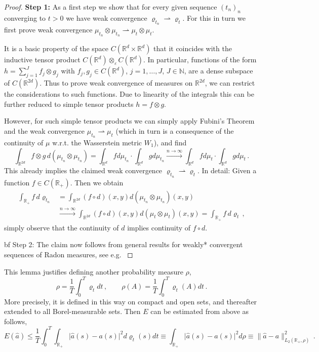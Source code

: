 \documentclass[A4paper,11pt]{article}
\theoremstyle{definition}
\newcommand{\N}{\mathbb{N}}
\newcommand{\R}{\mathbb{R}}
\begin{document}
\begin{proof}
	{\bf Step 1:} As a first step we show that for every given sequence $(t_n)_n$ converging to $t>0$ we have weak
	convergence $\varrho_{t_n}\rightharpoonup\varrho_t$. For this in turn we first prove weak convergence
	$\mu_{t_n}\otimes\mu_{t_n}\rightharpoonup\mu_t\otimes\mu_t$.
	
	It is a basic property of the space $C(\R^d\times\R^d)$ that it coincides with the inductive tensor product
	$C(\R^d)\otimes_\varepsilon C(\R^d)$. In particular, functions of the form $h=\sum_{j=1}^J f_j\otimes g_j$ with
	$f_j,g_j\in C(\R^d)$, $j=1,\ldots,J$, $J\in\N$, are a dense subspace of $C(\R^{2d})$. Thus to prove weak
	convergence of measures on $\R^{2d}$, we can restrict the considerations to such functions. Due to linearity of the
	integrals this can be further reduced to simple tensor products $h=f\otimes g$.
	
	However, for such simple tensor products we can simply apply Fubini's Theorem and the weak convergence
	$\mu_{t_n}\rightharpoonup\mu_t$ (which in turn is a consequence of the continuity of $\mu$ w.r.t. the
	Wasserstein metric $W_1$), and find
	\[
		\int_{\R^{2d}}f\otimes g\, d(\mu_{t_n}\otimes\mu_{t_n})
			=\int_{\R^d}f d\mu_{t_n}\cdot\int_{\R^d}g d\mu_{t_n}
			\stackrel{n\rightarrow\infty}{\longrightarrow}\int_{\R^d}f d\mu_t\cdot\int_{\R^d}g d\mu_t\,.
	\]
	This already implies the claimed weak convergence $\varrho_{t_n}\rightharpoonup\varrho_t$. In detail: Given a
	function $f\in C(\R_+)$. Then we obtain
	\begin{align*}
		\int_{\R_+}f\,d\varrho_{t_n}
			&=\int_{\R^{2d}}(f\circ d)(x,y)d(\mu_{t_n}\otimes\mu_{t_n})(x,y)\\
			&\stackrel{n\rightarrow\infty}{\longrightarrow}
				\int_{\R^{2d}}(f\circ d)(x,y)d(\mu_t\otimes\mu_t)(x,y)
			=\int_{\R_+}f\,d\varrho_t\,,
	\end{align*}
	simply observe that the continuity of $d$ implies continuity of $f\circ d$.
	
	{bf Step 2:} The claim now follows from general results for weakly* convergent sequences of Radon measures, see
	e.g. \cite[Proposition 1.62]{AmbrosiaFuscoPallara}
\end{proof}

This lemma justifies defining another probability measure $\rho$,
\begin{equation}\label{eq-rho-4}
	\rho=\frac{1}{T}\int_0^T\varrho_t dt\,,\qquad\rho(A)=\frac{1}{T}\int_0^T\varrho_t(A)dt\,.
\end{equation}
More precisely, it is defined in this way on compact and open sets, and thereafter extended to all Borel-measurable sets. Then $E$ can be estimated from above as follows,
\begin{equation}\label{eq-rho-3}
	E(\widehat a)\leq\frac{1}{T}\int_0^T\int_{\R_+}\bigl|\widehat a(s)-a(s)\bigr|^2 d\varrho_t(s) dt
		\equiv\int_{\R_+} \bigl|\widehat a(s)-a(s)\bigr|^2 d\rho
		\equiv\|\widehat a-a\|^2_{L_2(\R_+,\rho)}\,.
\end{equation}
\end{document}
